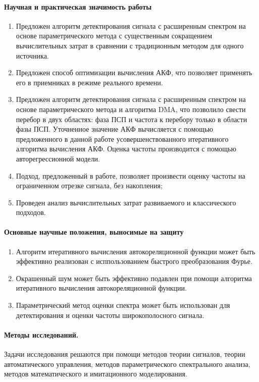 \paragraph{Научная и практическая значимость работы}
\begin{enumerate}
	\item Предложен алгоритм детектирования сигнала с расширенным спектром на основе параметрического метода с существенным
		сокращением вычислительных затрат в сравнении с традиционным методом для одного источника.
	\item Предложен способ оптимизации вычисления АКФ, что позволяет применять его в приемниках в режиме реального времени.
	\item Предложен алгоритм детектирования сигнала с расширенным спектром на основе параметрического метода и алгоритма DMA,
		что позволило свести перебор в двух областях: фаза ПСП и частота к перебору только в области фазы ПСП. Уточненное
		значение АКФ вычисляется с помощью предложенного в данной работе усовершенствованного итеративного алгоритма вычисления
		АКФ. Оценка частоты производится с помощью авторегрессионной модели.
	\item {Подход, предложенный в работе, позволяет произвести оценку частоты на ограниченном отрезке сигнала, без накопления;}
	\item{Проведен анализ вычислительных затрат развиваемого и классического подходов.}
\end{enumerate}

\paragraph{Основные научные положения, выносимые на защиту}
\begin{enumerate}
	\item {Алгоритм итеративного вычисления автокореляционной функции может быть эффективно реализован с исппользованием быстрого преобразования Фурье.}
	\item {Окрашенный шум может быть эффективно подавлен при помощи алгоритма итеративного вычисления автокореляционной функции.}
	\item {Параметрический метод оценки спектра может быть использован для детектирования и оценки частоты широкополосного сигнала.}
\end{enumerate}

\paragraph{Методы исследований.} Задачи исследования решаются при помощи методов теории сигналов, теории автоматического управления,
методов параметрического спектрального анализа, методов математического и имитационного моделирования.

